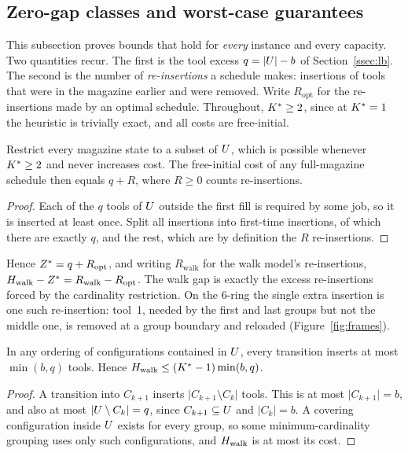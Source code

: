 \subsection{Zero-gap classes and worst-case guarantees}\label{ssec:ratio}

This subsection proves bounds that hold for \emph{every} instance and every capacity.
Two quantities recur. The first is the tool excess $q=\lvert U\rvert-b$ of
Section~\ref{ssec:lb}. The second is the number of \emph{re-insertions} a schedule
makes: insertions of tools that were in the magazine earlier and were removed. Write
$R_{\mathrm{opt}}$ for the re-insertions made by an optimal schedule. Throughout,
$K^{\ast}\ge2$, since at $K^{\ast}=1$ the heuristic is trivially exact, and all costs are
free-initial.

\begin{lemma}\label{lem:costid}
Restrict every magazine state to a subset of $U$, which is possible whenever
$K^{\ast}\ge2$ and never increases cost. The free-initial cost of any full-magazine
schedule then equals $q+R$, where $R\ge0$ counts re-insertions.
\end{lemma}

\begin{proof}
Each of the $q$ tools of $U$ outside the first fill is required by some job, so it
is inserted at least once. Split all insertions into first-time insertions, of which
there are exactly $q$, and the rest, which are by definition the $R$ re-insertions.
\end{proof}

Hence $Z^{\ast}=q+R_{\mathrm{opt}}$, and writing $R_{\mathrm{walk}}$ for the walk model's
re-insertions, $H_{\mathrm{walk}}-Z^{\ast}=R_{\mathrm{walk}}-R_{\mathrm{opt}}$. The walk gap is
exactly the excess re-insertions forced by the cardinality restriction. On the
$6$-ring the single extra insertion is one such re-insertion: tool~1, needed by the
first and last groups but not the middle one, is removed at a group boundary and
reloaded (Figure~\ref{fig:frames}).

\begin{lemma}\label{lem:transcap}
In any ordering of configurations contained in $U$, every transition inserts at most
$\min(b,q)$ tools. Hence $H_{\mathrm{walk}}\le(K^{\ast}-1)\min(b,q)$.
\end{lemma}

\begin{proof}
A transition into $C_{k+1}$ inserts $\lvert C_{k+1}\setminus C_k\rvert$ tools. This
is at most $\lvert C_{k+1}\rvert=b$, and also at most
$\lvert U\setminus C_k\rvert=q$, since $C_{k+1}\subseteq U$ and
$\lvert C_k\rvert=b$. A covering configuration inside $U$ exists for every group, so
some minimum-cardinality grouping uses only such configurations, and $H_{\mathrm{walk}}$ is at
most its cost.
\end{proof}

